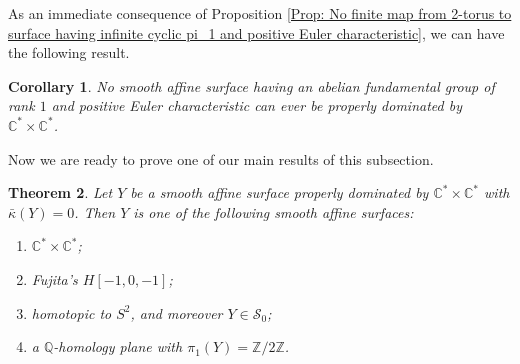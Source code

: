 \documentclass[12pt,reqno,twoside]{amsart}
\newtheorem{theorem}{Theorem}[section]
\newtheorem{cor}[theorem]{Corollary}
\theoremstyle{definition}
\numberwithin{equation}{section}
\newcommand{\C}{\mathbb{C}}
\newcommand{\Q}{\mathbb{Q}}
\newcommand{\Z}{\mathbb{Z}}
\newcommand{\Kbar}{\bar{\kappa}}
\begin{document}
As an immediate consequence of Proposition \ref{Prop: No finite map from 2-torus to surface having infinite cyclic pi_1 and positive Euler characteristic}, we can have the following result.

\begin{cor}\label{Cor: No finite map from 2-torus to surface having rank 1 abelian pi_1 and positive Euler characteristic}
	No smooth affine surface having an abelian fundamental group of rank $1$ and positive Euler characteristic can ever be properly dominated by $\C^* \times \C^*$.
\end{cor}

Now we are ready to prove one of our main results of this subsection.
\begin{theorem}\label{Thm: Affine surfaces with kappa=0 properly dominated by 2-torus}
	Let $Y$ be a smooth affine surface properly dominated by $\C^*\times \C^*$ with $\Kbar(Y)=0$. Then $Y$ is one of the following smooth affine surfaces:
    \begin{enumerate}[\indent\rm(1)]
        \item $\C^*\times \C^*$;
        \item Fujita's $H[-1,0,-1]$;
        \item homotopic to $S^2$, and moreover $Y\in \mathcal{S}_0$;
        \item a $\Q$-homology plane with $\pi_1(Y)=\Z/2\Z$.
    \end{enumerate}
\end{theorem}
\end{document}
